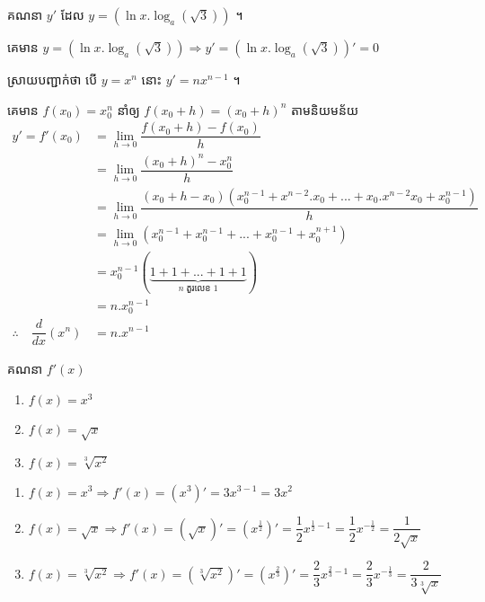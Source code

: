 \documentclass[a4paper,12pt]{article}
\begin{document}
\begin{example}
	គណនា $y'$ ដែល $y=\left(\ln x .\log_a (\sqrt{3}) \right)$ ។
\end{example}
\answer
គេមាន $y=\left(\ln x .\log_a (\sqrt{3}) \right)\Rightarrow y'=\left(\ln x .\log_a (\sqrt{3}) \right)'=0$
\begin{example}
	ស្រាយបញ្ជាក់ថា បើ $y=x^n$ នោះ $y'=nx^{n-1}$ ។
\end{example}
\solution
គេមាន $f(x_0)=x^n_0$ នាំឲ្យ $f(x_0+h)=(x_0+h)^n$ តាមនិយមន័យ
\begin{align*}
	y'=f'(x_0)                          & =\lim_{h\to 0}\dfrac{f(x_0+h)-f(x_0)}{h}                                                 \\
	                                    & =\lim_{h\to 0}\dfrac{(x_0+h)^n-x^n_0}{h}                                                 \\
	                                    & =\lim_{h\to 0}\dfrac{(x_0+h-x_0)(x^{n-1}_0+x^{n-2}.x_0+...+x_0.x^{n-2}x_0+x^{n-1}_0)}{h} \\
	                                    & =\lim_{h\to 0}(x^{n-1}_0+x^{n-1}_0+...+x^{n-1}_0+x^{n+1}_0)                              \\
	                                    & =x^{n-1}_0(\underbrace{1+1+...+1+1}_{n\; \text{តួរលេខ 1}})                                \\
	                                    & =n.x^{n-1}_0                                                                             \\
	\therefore \quad \dfrac{d}{dx}(x^n) & =n.x^{n-1}
\end{align*}
\begin{example}
	គណនា $f'(x)$
	\begin{multicols}{3}
		\begin{enumerate}
			\item $f(x)=x^3$
			\item $f(x)=\sqrt{x}$
			\item $f(x)=\sqrt[3]{x^2}$
		\end{enumerate}
	\end{multicols}
\end{example}
\answer
\begin{enumerate}
	\item $f(x)=x^3 \Rightarrow f'(x)=(x^3)'=3 x^{3-1}=3x^2$
	\item $f(x)=\sqrt{x} \Rightarrow f'(x)=(\sqrt{x})'=(x^{\frac{1}{2}})'=\dfrac{1}{2}x^{\frac{1}{2}-1}=\dfrac{1}{2}x^{-\frac{1}{2}}=\dfrac{1}{2\sqrt{x}}$
	\item $f(x)=\sqrt[3]{x^2}\Rightarrow f'(x)=(\sqrt[3]{x^2})'=(x^{\frac{2}{3}})'=\dfrac{2}{3}x^{\frac{2}{3}-1}=\dfrac{2}{3}x^{-\frac{1}{3}}=\dfrac{2}{3\sqrt[3]{x}}$
\end{enumerate}
\end{document}
